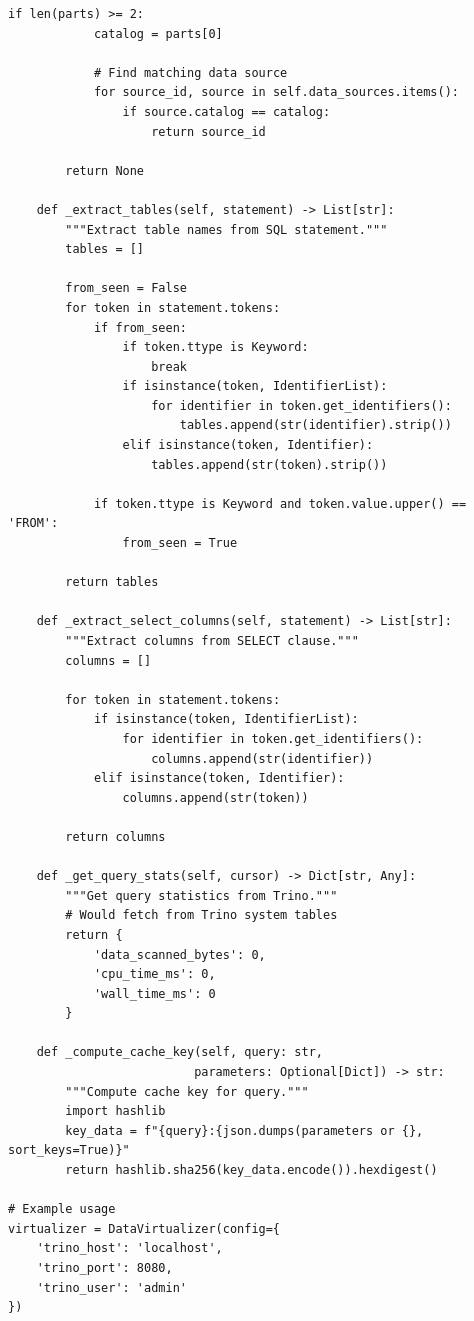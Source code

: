 \begin{lstlisting}[style=python, caption=DataVirtualizer with Federated Queries]
        if len(parts) >= 2:
            catalog = parts[0]

            # Find matching data source
            for source_id, source in self.data_sources.items():
                if source.catalog == catalog:
                    return source_id

        return None

    def _extract_tables(self, statement) -> List[str]:
        """Extract table names from SQL statement."""
        tables = []

        from_seen = False
        for token in statement.tokens:
            if from_seen:
                if token.ttype is Keyword:
                    break
                if isinstance(token, IdentifierList):
                    for identifier in token.get_identifiers():
                        tables.append(str(identifier).strip())
                elif isinstance(token, Identifier):
                    tables.append(str(token).strip())

            if token.ttype is Keyword and token.value.upper() == 'FROM':
                from_seen = True

        return tables

    def _extract_select_columns(self, statement) -> List[str]:
        """Extract columns from SELECT clause."""
        columns = []

        for token in statement.tokens:
            if isinstance(token, IdentifierList):
                for identifier in token.get_identifiers():
                    columns.append(str(identifier))
            elif isinstance(token, Identifier):
                columns.append(str(token))

        return columns

    def _get_query_stats(self, cursor) -> Dict[str, Any]:
        """Get query statistics from Trino."""
        # Would fetch from Trino system tables
        return {
            'data_scanned_bytes': 0,
            'cpu_time_ms': 0,
            'wall_time_ms': 0
        }

    def _compute_cache_key(self, query: str,
                          parameters: Optional[Dict]) -> str:
        """Compute cache key for query."""
        import hashlib
        key_data = f"{query}:{json.dumps(parameters or {}, sort_keys=True)}"
        return hashlib.sha256(key_data.encode()).hexdigest()

# Example usage
virtualizer = DataVirtualizer(config={
    'trino_host': 'localhost',
    'trino_port': 8080,
    'trino_user': 'admin'
})


\end{lstlisting}
